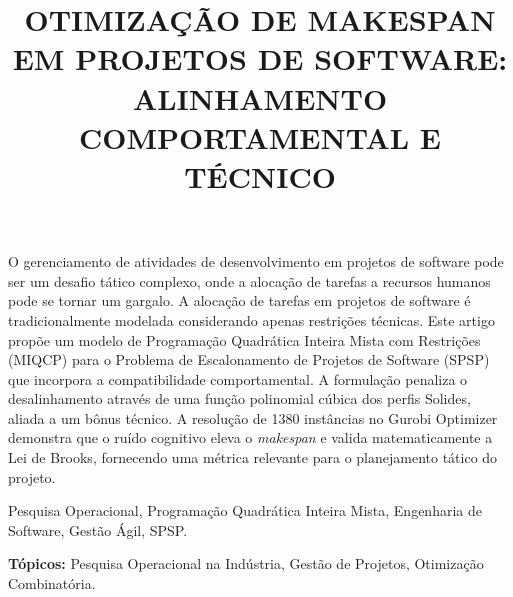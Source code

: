 \documentclass[a4paper,11pt]{article}
\begin{document}
\title{OTIMIZAÇÃO DE MAKESPAN EM PROJETOS DE SOFTWARE: \\
ALINHAMENTO COMPORTAMENTAL E TÉCNICO}

\maketitle
\thispagestyle{fancy}

\author{
}

\author{ 
}

\vspace{5mm}
\begin{resumo}
    O gerenciamento de atividades de desenvolvimento em projetos de software
    pode ser um desafio tático complexo, onde a alocação de tarefas a recursos
    humanos pode se tornar um gargalo. A alocação de tarefas em projetos de
    software é tradicionalmente modelada considerando apenas restrições técnicas.
    Este artigo propõe um modelo de Programação Quadrática Inteira Mista com Restrições (MIQCP)
    para o Problema de Escalonamento de Projetos de Software (SPSP) que incorpora a
    compatibilidade comportamental. A formulação penaliza o desalinhamento através
    de uma função polinomial cúbica dos perfis Solides, aliada a um bônus técnico.
    A resolução de 1380 instâncias no Gurobi Optimizer demonstra que o ruído cognitivo
    eleva o \textit{makespan} e valida matematicamente a Lei de Brooks, fornecendo
    uma métrica relevante para o planejamento tático do projeto.
\end{resumo}

\begin{palchaves}
Pesquisa Operacional, Programação Quadrática Inteira Mista, Engenharia de Software, 
Gestão Ágil, SPSP.

\vspace{0.3cm}
\noindent \textbf{Tópicos:} Pesquisa Operacional na Indústria, Gestão de Projetos, 
Otimização Combinatória.
\end{palchaves}

\vspace{5mm}
\end{document}
